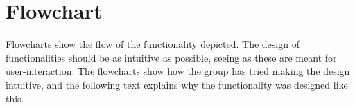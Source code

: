 \clearpage\section{Flowchart}
Flowcharts show the flow of the functionality depicted. The design of functionalities should be as intuitive as possible, seeing as these are meant for user-interaction. The flowcharts show how the group has tried making the design intuitive, and the following text explains why the functionality was designed like this.

